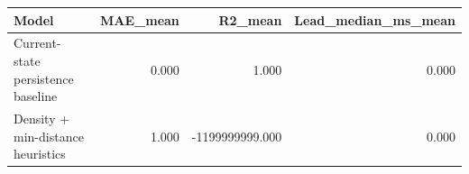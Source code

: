 \begin{tabular}{lrrr}
\toprule
Model & MAE\_mean & R2\_mean & Lead\_median\_ms\_mean \\
\midrule
Current-state persistence baseline & 0.000 & 1.000 & 0.000 \\
Density + min-distance heuristics & 1.000 & -1199999999.000 & 0.000 \\
\bottomrule
\end{tabular}